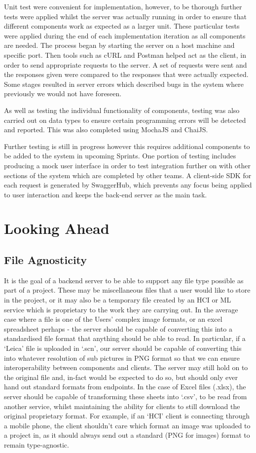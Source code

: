\documentclass{article}
\begin{document}
Unit test were convenient for implementation, however, to be thorough further tests were applied whilst the server was actually running in order to ensure that different components work as expected as a larger unit. These particular tests were applied during the end of each implementation iteration as all components are needed. The process began by starting the server on a host machine and specific port. Then tools such as cURL and Postman helped act as the client, in order to send appropriate requests to the server. A set of requests were sent and the responses given were compared to the responses that were actually expected. Some stages resulted in server errors which described bugs in the system where previously we would not have foreseen. 

As well as testing the individual functionality of components, testing was also carried out on data types to ensure certain programming errors will be detected and reported. This was also completed using MochaJS and ChaiJS.

Further testing is still in progress however this requires additional components to be added to the system in upcoming Sprints. One portion of testing includes producing a mock user interface in order to test integration further on with other sections of the system which are completed by other teams. A client-side SDK for each request is generated by SwaggerHub, which prevents any focus being applied to user interaction and keeps the back-end server as the main task.

\section{Looking Ahead}
\subsection{File Agnosticity}
It is the goal of a backend server to be able to support any file type possible as part of a project. These may be miscellaneous files that a user would like to store in the project, or it may also be a temporary file created by an HCI or ML service which is proprietary to the work they are carrying out. In the average case where a file is one of the Users’ complex image formats, or an excel spreadsheet perhaps - the server should be capable of converting this into a standardised file format that anything should be able to read. In particular, if a ‘Leica’ file is uploaded in ‘.scn’, our server should be capable of converting this into whatever resolution of sub pictures in PNG format so that we can ensure interoperability between components and clients.  The server may still hold on to the original file and, in-fact would be expected to do so, but should only ever hand out standard formats from endpoints. In the case of Excel files (.xlsx), the server should be capable of transforming these sheets into ‘.csv’, to be read from another service, whilst maintaining the ability for clients to still download the original proprietary format. For example, if an ‘HCI’ client is connecting through a mobile phone, the client shouldn’t care which format an image was uploaded to a project in, as it should always send out a standard (PNG for images) format to remain type-agnostic.
\end{document}
